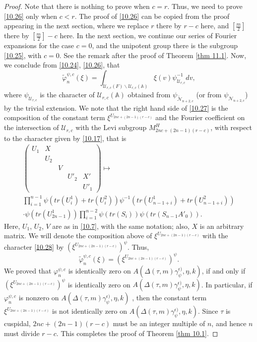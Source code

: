\documentclass[12pts]{amsart}
\newcommand{\BA}{{\mathbb {A}}}
\begin{document}
\begin{proof}
Note that there is nothing to prove when $c=r$. Thus, we need to prove \eqref{10.26} only when $c<r$. The proof of \eqref{10.26} can be copied from the proof appearing in the next section, where we replace $r$ there by $r-c$ here, and $[\frac{m}{2}]$ there by $[\frac{m}{2}]-c$ here. In the next section, we continue our series of Fourier expansions for the case $c=0$, and the unipotent group there is the subgroup \eqref{10.25}, with $c=0$. See the remark after the proof of Theorem \ref{thm 11.1}. Now, we conclude from \eqref{10.24}, \eqref{10.26}, that
\begin{equation}\label{10.27}
 \tilde{\varphi}_n^{\psi,c}(\xi)=\int_{\mathcal{U}_{r,c}(F)\backslash \mathcal{U}_{r,c}(\BA)}
 \xi(v)\psi^{-1}_{\mathcal{U}_{r,c}}dv,
 \end{equation}
 where $\psi_{\mathcal{U}_{r,c}}$ is the character of $\mathcal{U}_{r,c}(\BA)$ obtained from $\psi_{\tilde{\mathcal{N}}_{n+2,c}}$ (or from $\psi_{\mathcal{N}_{n+2,c}}$) by the trivial extension. We note that the right hand side of \eqref{10.27} is the composition of the constant term $\xi^{U_{2nc+(2n-1)(r-c)}}$ and the Fourier coefficient on the intersection of  $\mathcal{U}_{r,c}$ with the Levi subgroup $M^H_{2nc+(2n-1)(r-c)}$, with respect to the character given by \eqref{10.17}, that is 
 \begin{multline}\label{10.28}
 \begin{pmatrix}U_1&X\\&U_2\\&&V\\&&&U'_2&X'\\&&&&U'_1\end{pmatrix}\mapsto \\
 \prod_{i=1}^{n-1}\psi(tr(U^1_i)+tr(U^2_i))\psi^{-1}(tr(U^1_{n-1+i})+tr(U^2_{n-1+i}))\\
 \cdot\psi(tr(U^1_{2n-1}))\prod_{i=1}^{n-2}\psi(tr(S_i))\psi(tr(S_{n-1}A'_0)).
\end{multline}
Here, $U_1$, $U_2$, $V$ are as in \eqref{10.7}, with the same notation; also, $X$ is an arbitrary matrix. We will denote the composition above of  $\xi^{U_{2nc+(2n-1)(r-c)}}$ with the character \eqref{10.28} by $(\xi^{U_{2nc+(2n-1)(r-c)}})^\psi$. Thus,
 \begin{equation}\label{10.29}
 \tilde{\varphi}_n^{\psi,c}(\xi)= 
 (\xi^{U_{2nc+(2n-1)(r-c)}})^\psi.
 \end{equation}
  We proved that $\varphi_n^{\psi,c}$ is identically zero on $A(\Delta(\tau,m)\gamma_\psi^{\epsilon)},\eta,k)$, if and only if \\
   $(\xi^{U_{2nc+(2n-1)(r-c)}})^\psi $ is identically zero on $A(\Delta(\tau,m)\gamma_\psi^{\epsilon)},\eta,k)$. In particular, if  $\varphi_n^{\psi,c}$ is nonzero on $A(\Delta(\tau,m)\gamma_\psi^{\epsilon)},\eta,k)$ , then the constant term  $\xi^{U_{2nc+(2n-1)(r-c)}}$ is not identically zero on $A(\Delta(\tau,m)\gamma_\psi^{\epsilon)},\eta,k)$.  Since $\tau$ is cuspidal, $2nc+(2n-1)(r-c)$ must be an integer multiple of $n$, and hence $n$ must divide $r-c$. This completes the proof of Theorem \ref{thm 10.1}.
   \end{proof}
   
\end{document}
